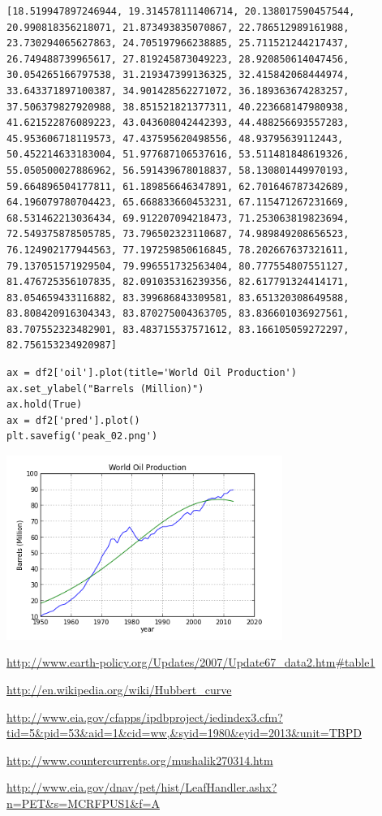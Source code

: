 \documentclass[12pt,fleqn]{article}\usepackage{../common}
\begin{document}
\begin{verbatim}
[18.519947897246944, 19.314578111406714, 20.138017590457544, 20.990818356218071, 21.873493835070867, 22.786512989161988, 23.730294065627863, 24.705197966238885, 25.711521244217437, 26.749488739965617, 27.819245873049223, 28.920850614047456, 30.054265166797538, 31.219347399136325, 32.415842068444974, 33.643371897100387, 34.901428562271072, 36.189363674283257, 37.506379827920988, 38.851521821377311, 40.223668147980938, 41.621522876089223, 43.043608042442393, 44.488256693557283, 45.953606718119573, 47.437595620498556, 48.93795639112443, 50.452214633183004, 51.977687106537616, 53.511481848619326, 55.050500027886962, 56.591439678018837, 58.130801449970193, 59.664896504177811, 61.189856646347891, 62.701646787342689, 64.196079780704423, 65.668833660453231, 67.115471267231669, 68.531462213036434, 69.912207094218473, 71.253063819823694, 72.549375878505785, 73.796502323110687, 74.989849208656523, 76.124902177944563, 77.197259850616845, 78.202667637321611, 79.137051571929504, 79.996551732563404, 80.777554807551127, 81.476725356107835, 82.091035316239356, 82.617791324414171, 83.054659433116882, 83.399686843309581, 83.651320308649588, 83.808420916304343, 83.870275004363705, 83.836601036927561, 83.707552323482901, 83.483715537571612, 83.166105059272297, 82.756153234920987]
\end{verbatim}

\begin{verbatim}
ax = df2['oil'].plot(title='World Oil Production')
ax.set_ylabel("Barrels (Million)")
ax.hold(True)
ax = df2['pred'].plot()
plt.savefig('peak_02.png')
\end{verbatim}

\includegraphics[height=6cm]{peak_02.png}

\url{http://www.earth-policy.org/Updates/2007/Update67_data2.htm#table1}

\url{http://en.wikipedia.org/wiki/Hubbert_curve}

\url{http://www.eia.gov/cfapps/ipdbproject/iedindex3.cfm?tid=5&pid=53&aid=1&cid=ww,&syid=1980&eyid=2013&unit=TBPD}

\url{http://www.countercurrents.org/mushalik270314.htm}

\url{http://www.eia.gov/dnav/pet/hist/LeafHandler.ashx?n=PET&s=MCRFPUS1&f=A}
\end{document}
